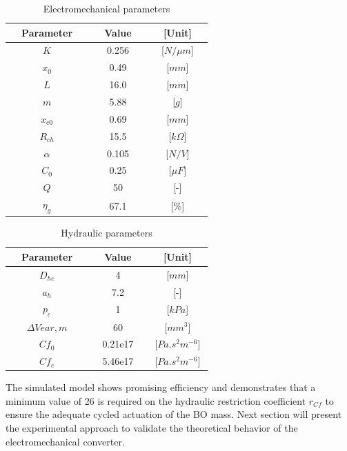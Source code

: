 \documentclass[3p,twocolumn,preprint]{elsarticle}
\begin{document}
\begin{table}	
	\centering
	\begin{tabular}{c|c|c}
\toprule
\multicolumn{1}{c}{~~\textbf{Parameter}~~}  & \multicolumn{1}{c}{~~\textbf{Value}~~} & \multicolumn{1}{c}{~~\textbf{[Unit]}~~}  \\
\midrule
$K$					&	0.256			& [$N/\mu m$]			\\ \hline
$x_0$				&	0.49			& [$mm$] 				\\ \hline
$L$					&	16.0			& [$mm$] 				\\ \hline
$m$					&	5.88			& [$g$] 				\\ \hline
$x_{c0}$			&	0.69			& [$mm$] 				\\ \hline
$R_{ch}$			&	15.5			& [$k\Omega$] 			\\ \hline
$\alpha$			&   0.105			& [$N/V$] 				\\ \hline
$C_0$	   			&	0.25			& [$\mu F$]				\\ \hline
$Q$ 				&	50				& [-] 					\\ \hline
$\eta_g$			& 	67.1			& [$\%$]		\\ 
\bottomrule
	\end{tabular}
	\caption{Electromechanical parameters}
	\label{tab:parametres électromécaniques}
\end{table}
\begin{table}
	\centering
	\begin{tabular}{c|c|c}
\toprule
\multicolumn{1}{c}{~~\textbf{Parameter}~~}  & \multicolumn{1}{c}{~~\textbf{Value}~~} & \multicolumn{1}{c}{~~\textbf{[Unit]}~~}  \\
\midrule
$D_{hc}$  	   				&	4				& [$mm$]			\\ \hline
$a_h$					&	7.2				& [-]				\\ \hline
$p_c$					&	1				& [$kPa$]			\\ \hline
$\Delta V{ear,m}$		& 60				& [$mm^3$]			\\ \hline
$Cf_0$					&	0.21e17			&[$Pa.s^2m^{-6}$]	\\ \hline
$Cf_c$					&	5.46e17			&[$Pa.s^2m^{-6}$]	\\
\bottomrule 
	\end{tabular}
	\caption{Hydraulic parameters}
	\label{tab:parametres_hydrauliques}
\end{table}

The simulated model shows promising efficiency and demonstrates that a minimum value of 26 is required on the hydraulic restriction coefficient $r_{Cf}$ to ensure the adequate cycled actuation of the BO mass. Next section will present the experimental approach to validate the theoretical behavior of the electromechanical converter.
\end{document}
